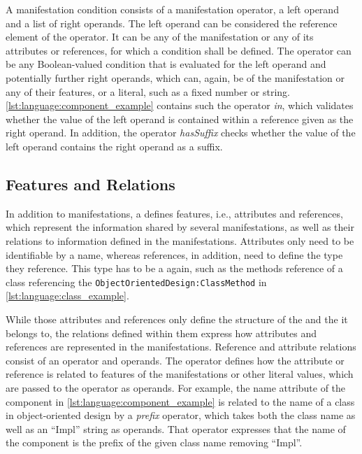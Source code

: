A manifestation condition consists of a manifestation operator, a left operand and a list of right operands.
The left operand can be considered the reference element of the operator. 
It can be any \metaclass of the manifestation or any of its attributes or references, for which a condition shall be defined.
The operator can be any Boolean-valued condition that is evaluated for the left operand and potentially further right operands, which can, again, be \metaclasses of the manifestation or any of their features, or a literal, such as a fixed number or string.
\autoref{lst:language:component_example} contains such the operator \emph{in}, which validates whether the value of the left operand is contained within a reference given as the right operand.
In addition, the operator \emph{hasSuffix} checks whether the value of the left operand contains the right operand as a suffix.


\subsection{Features and Relations}
\label{chap:language:commonalities:features}

In addition to manifestations, a \commonality defines features, i.e., attributes and references, which represent the information shared by several manifestations, as well as their relations to information defined in the manifestations.
Attributes only need to be identifiable by a name, whereas references, in addition, need to define the type they reference.
This type has to be a \commonality again, such as the methods reference of a class referencing the \commonality \texttt{ObjectOrientedDesign:ClassMethod} in \autoref{lst:language:class_example}.

While those attributes and references only define the structure of the \commonality and the \conceptmetamodel it belongs to, the relations defined within them express how attributes and references are represented in the manifestations.
Reference and attribute relations consist of an operator and operands.
The operator defines how the \commonality attribute or reference is related to features of the manifestations or other literal values, which are passed to the operator as operands.
For example, the name attribute of the component \commonality in \autoref{lst:language:component_example} is related to the name of a class in object-oriented design by a \emph{prefix} operator, which takes both the class name as well as an \enquote{Impl} string as operands.
That operator expresses that the name of the component \commonality is the prefix of the given class name removing \enquote{Impl}.

